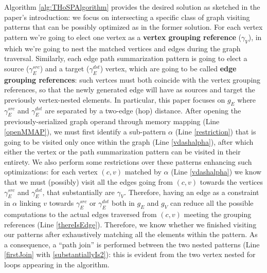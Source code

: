 Algorithm \ref{alg:THoSPAlgorithm} provides the desired solution as sketched in the paper's introduction: we focus on intersecting a specific class of graph visiting patterns that can be possibly optimized as in the former solution. For each vertex pattern we're going to elect one vertex as a \textbf{vertex grouping reference} ($\gamma_V$), in which we're going to nest the matched vertices and edges  during the graph traversal. Similarly, each edge path summarization pattern is going to elect a source ($\gamma_E^{src}$) and a target ($\gamma_E^{dst}$) vertex, which are going to be called \textbf{edge grouping references}: such vertces must both coincide with the vertex grouping references, so that the newly generated edge will have as sources and target the previously vertex-nested elements. In particular, this paper focuses on $g_E$ where $\gamma_E^{src}$  and $\gamma_E^{dst}$ are separated by a two-edge (hop) distance.
 After opening the previously-serialized graph operand through memory mapping (Line \ref{openMMAP}), we must first identify a sub-pattern $\alpha$ (Line \ref{restriction}) that is going to be visited only once within the graph (Line \ref{vdashalpha}), after which either the vertex or the path summarization pattern can be visited in their entirety. We also perform some restrictions over these patterns enhancing such optimizations: for each vertex $(c,v)$ matched by $\alpha$ (Line \ref{vdashalpha}) we know that we must (possibly) visit all the edges going from $(c,v)$ towards the vertices $\gamma_E^{src}$ and $\gamma_E^{dst}$, that substantially are $\gamma_V$.  Therefore, having an edge as a constraint in $\alpha$ linking $v$ towards $\gamma_E^{src}$ or $\gamma_E^{dst}$ both in $g_E$ and $g_V$ can reduce all the possible computations to the actual edges traversed from $(c,v)$ meeting the grouping references (Line \ref{thereIsEdge}). Therefore, we know whether we finished visiting our patterns after exhaustively matching all the elements within the pattern.
As a consequence, a ``path join'' is performed between the two nested patterns (Line \ref{firstJoin} with \ref{substantiallyIs2}): this is evident from the two vertex nested for loops appearing in the algorithm.  %

